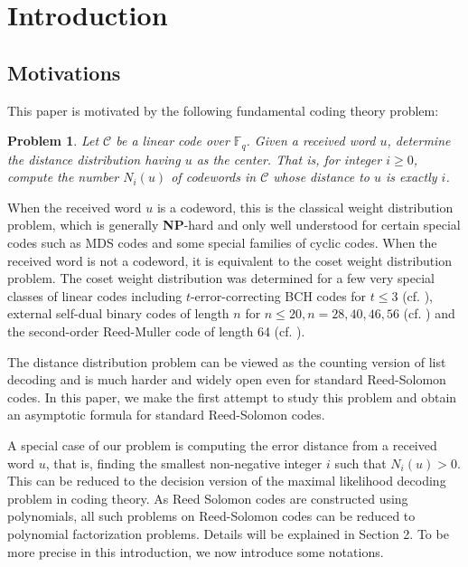 \documentclass[reqno]{amsart}
\newtheorem{prob}[thm]{Problem}
\theoremstyle{remark}
\numberwithin{equation}{section}
\newcommand{\f}{\mathbb{F}_q}
\begin{document}
\maketitle {}
\newtheorem{theorem}{Theorem}[section]
\newtheorem{lemma}[theorem]{Lemma}
\newtheorem{example}[theorem]{Example}
\allowdisplaybreaks


\section{Introduction}

\subsection{Motivations}

This paper is motivated by  the following fundamental coding theory problem:

\begin{prob}
 Let $\mathcal{C}$ be a linear code over $\f$. Given a received word  $u$,  determine the distance distribution having $u$ as the center.
That is, for integer $i\geq 0$, compute the number $N_i(u)$ of codewords in $\mathcal{C}$ whose distance to $u$ is exactly $i$.
\end{prob}


When the received word $u$ is a codeword, this is the classical weight
distribution problem, which is generally {\bf NP}-hard and only well understood for certain special codes such as MDS codes and some special families of cyclic codes. When the received word is not a codeword, it is equivalent to the coset weight distribution problem. The coset weight
distribution was determined for a few very special classes of linear codes including $t$-error-correcting BCH codes for $t\leq 3$  (cf. \cite{C1, CHZ, CZ}), external  self-dual binary codes of length $n$ for $n\leq 20, n=28, 40, 46, 56$ (cf. \cite{Ha, HN, O2, O1}) and the second-order {R}eed-{M}uller  code of length 64 (cf. \cite{BA, OW}).



The distance distribution problem can be viewed as the counting version of list decoding and is much harder and widely open even for standard Reed-Solomon codes.    In this paper, we make the first attempt to study this problem and obtain an asymptotic formula for standard Reed-Solomon codes.

A special case of our problem is computing the
error distance from a received word $u$, that is, finding the smallest non-negative integer $i$ such that $N_i(u)>0$.
This can be reduced to the decision version of the maximal likelihood decoding problem in coding theory.   As Reed Solomon codes are
constructed using polynomials, all such problems on Reed-Solomon codes can be reduced to polynomial factorization problems.
Details will be explained in Section 2. To be more precise in this introduction, we now introduce some notations.
\end{document}
